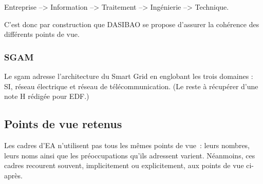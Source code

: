 \begin{center}
Entreprise --> Information --> Traitement --> Ingénierie --> Technique.
\end{center}

C'est donc par construction que DASIBAO se propose d'assurer la cohérence des
différents points de vue.

\subsubsection{SGAM}

Le \gls{sgam} \cite{uslar2012standardization} adresse l'architecture du Smart Grid en englobant les trois domaines : SI, réseau électrique et réseau de télécommunication. (Le reste à récupérer d'une note H rédigée pour EDF.)


\subsection{Points de vue retenus}
Les cadres d'EA n'utilisent pas tous les mêmes points de vue~: leurs nombres,
leurs noms ainsi que les préoccupations qu'ils adressent varient. Néanmoins,
ces cadres recourent souvent, implicitement ou explicitement, aux points de vue
ci-après.

